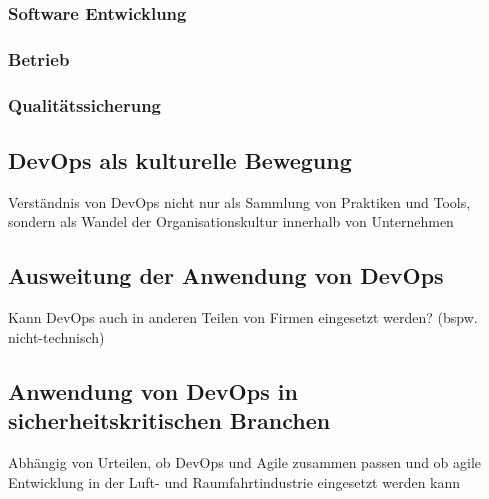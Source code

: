\subsubsection{Software Entwicklung}

\subsubsection{Betrieb}

\subsubsection{Qualitätssicherung}

\subsection{DevOps als kulturelle Bewegung}
Verständnis von DevOps nicht nur als Sammlung von Praktiken und Tools, sondern als Wandel
der Organisationskultur innerhalb von Unternehmen

\subsection{Ausweitung der Anwendung von DevOps}
Kann DevOps auch in anderen Teilen von Firmen eingesetzt werden? (bspw. nicht-technisch)

\subsection{Anwendung von DevOps in sicherheitskritischen Branchen}
Abhängig von Urteilen, ob DevOps und Agile zusammen passen und ob agile Entwicklung in der
Luft- und Raumfahrtindustrie eingesetzt werden kann
